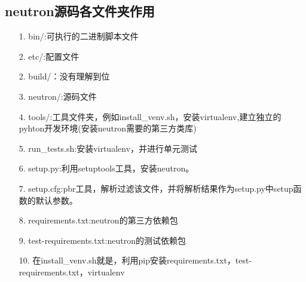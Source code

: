 \documentclass[a4paper,left=1.5cm,right=1.5cm,11pt]{article}
\begin{document}
\tableofcontents

\clearpage

\subsection{neutron源码各文件夹作用}
    \begin{itemize}
        \item[1.]bin/:可执行的二进制脚本文件
		\item[2.]etc/:配置文件
		\item[2.]build/：没有理解到位
		\item[3.]neutron/:源码文件
		\item[4.]tools/:工具文件夹，例如install_venv.sh，安装virtualenv,建立独立的pyhton开发环境(安装neutron需要的第三方类库)
		\item[5.]run_tests.sh:安装virtualenv，并进行单元测试
		\item[6.]setup.py:利用setuptools工具，安装neutron。
		\item[7.]setup.cfg:pbr工具，解析过滤该文件，并将解析结果作为setup.py中setup函数的默认参数。
		\item[8.]requirements.txt:neutron的第三方依赖包
		\item[9.]test-requirements.txt:neutron的测试依赖包
		\item[10.]在install_venv.sh就是，利用pip安装requirements.txt，test-requirements.txt，virtualenv
    \end{itemize}
\end{document}
